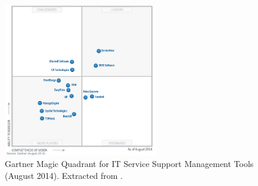 \begin{figure}[h!]
\centering
\includegraphics[width=0.6\textwidth]{img/GartnerITSMQuadrant.png}
\caption{Gartner Magic Quadrant for IT Service Support Management Tools (August 2014). Extracted from \cite{magicQuadrantITSM}.}
\end{figure}

